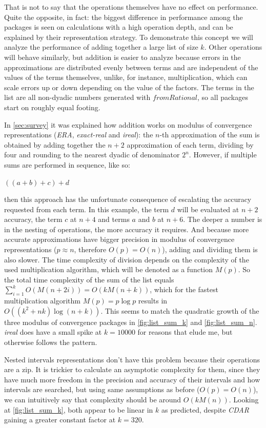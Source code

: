 That is not to say that the operations themselves have no effect on performance. Quite the opposite, in fact: the biggest difference in performance among the packages is seen on calculations with a high operation depth, and can be explained by their representation strategy. To demonstrate this concept we will analyze the performance of adding together a large list of size $k$. Other operations will behave similarly, but addition is easier to analyze because errors in the approximations are distributed evenly between terms and are independent of the values of the terms themselves, unlike, for instance, multiplication, which can scale errors up or down depending on the value of the factors. The terms in the list are all non-dyadic numbers generated with $fromRational$, so all packages start on roughly equal footing.

In \cref{sec:survey} it was explained how addition works on modulus of convergence representations (\textit{ERA}, \textit{exact-real} and \textit{ireal}): the $n$-th approximation of the sum is obtained by adding together the $n+2$ approximation of each term, dividing by four and rounding to the nearest dyadic of denominator $2^n$. However, if multiple sums are performed in sequence, like so:

$((a + b) + c) + d$

then this approach has the unfortunate consequence of escalating the accuracy requested from each term. In this example, the term $d$ will be evaluated at $n+2$ accuracy, the term $c$ at $n+4$ and terms $a$ and $b$ at $n+6$. The deeper a number is in the nesting of operations, the more accuracy it requires. And because more accurate approximations have bigger precision in modulus of convergence representations ($p \approx n$, therefore $O(p) = O(n)$), adding and dividing them is also slower. The time complexity of division depends on the complexity of the used multiplication algorithm, which will be denoted as a function $M(p)$. So the total time complexity of the sum of the list equals $\sum_{i=1}^{k} O(M(n+2i)) = O(kM(n+k))$, which for the fastest multiplication algorithm $M(p)=p\log{p}$ results in $O((k^2+nk)\log{(n+k)})$. This seems to match the quadratic growth of the three modulus of convergence packages in \cref{fig:list_sum_k} and \cref{fig:list_sum_n}. \textit{ireal} does have a small spike at $k=10000$ for reasons that elude me, but otherwise follows the pattern.

Nested intervals representations don't have this problem because their operations are a zip. It is trickier to calculate an asymptotic complexity for them, since they have much more freedom in the precision and accuracy of their intervals and how intervals are searched, but using same assumptions as before ($O(p) = O(n)$), we can intuitively say that complexity should be around $O(kM(n))$. Looking at \cref{fig:list_sum_k}, both appear to be linear in $k$ as predicted, despite \textit{CDAR} gaining a greater constant factor at $k=320$.

